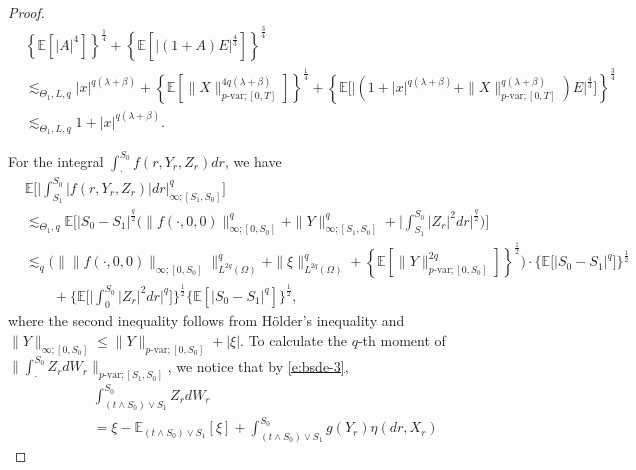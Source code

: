 \documentclass[11pt,reqno]{amsart}
\def\E{\mathbb E}
\numberwithin{equation}{section}
\begin{document}
\begin{proof}
\begin{equation*}
\begin{aligned}
&\left\{\mathbb{E}\left[|A|^{4}\right]\right\}^{\frac{1}{4}} +  \left\{\mathbb{E}\left[\left|\left(1 + A\right)E\right|^{\frac{4}{3}}\right]\right\}^{\frac{3}{4}}\\
&\lesssim_{\Theta_{1},L,q} |x|^{q(\lambda+\beta)} + \left\{\E[\|X\|^{4q(\lambda+\beta)}_{p\text{-var};[0,T]}]\right\}^{\frac{1}{4}} + \left\{\mathbb{E}\Big[\big| (1 + |x|^{q(\lambda+\beta)}  + \|X\|^{q(\lambda+\beta)}_{p\text{-var};[0,T]} )E\big|^{\frac{4}{3}}\Big]\right\}^{\frac{3}{4}}\\
&\lesssim_{\Theta_{1},L,q} 1 + |x|^{q(\lambda+\beta)}.
\end{aligned}
\end{equation*}

For the integral $\int_{\cdot}^{S_{0}}f(r,Y_{r},Z_{r})dr$, we have 
\begin{equation}\label{e:f terms}
\begin{aligned}
&\mathbb{E}\bigg[\Big|\int_{S_1}^{S_{0}}\left|f(r,Y_r,Z_r)\right|dr\Big|^{q}_{\infty;[S_{1},S_{0}]}\bigg]\\
&\lesssim_{\Theta_{1},q} \mathbb{E}\bigg[|S_{0} - S_{1}|^{\frac{q}{2}}\Big(\|f(\cdot,0,0)\|^{q}_{\infty;[0,S_{0}]} + \|Y\|^{q}_{\infty;[S_{1},S_{0}]}  + \Big|\int_{S_{1}}^{S_{0}}|Z_{r}|^{2}dr \Big|^{\frac{q}{2}}\Big)\bigg]\\
&\lesssim_{q} \Big(\big\|\|f(\cdot,0,0)\|_{\infty;[0,S_{0}]}\big\|^{q}_{L^{2q}(\Omega)} + \|\xi\|^{q}_{L^{2q}(\Omega)} + \left\{\mathbb{E}\left[ \|Y\|^{2q}_{p\text{-var};[0,S_{0}]}\right]\right\}^{\frac{1}{2}}\Big)\cdot \Big\{\mathbb{E}\Big[|S_{0} - S_{1}|^{q}\Big]\Big\}^{\frac{1}{2}} \\ 
&\qquad  + \bigg\{\mathbb{E}\bigg[\Big|\int_{0}^{S_{0}}|Z_{r}|^{2}dr\Big|^{q}\bigg]\bigg\}^{\frac{1}{2}} \Big\{\mathbb{E}\left[|S_{0} - S_{1}|^{q}\right]\Big\}^{\frac{1}{2}},
\end{aligned}
\end{equation}
where the second inequality follows from H\"older's inequality and $\|Y\|_{\infty;[0,S_{0}]}\le \|Y\|_{p\text{-var};[0,S_{0}]} + |\xi|$.
To calculate the $q$-th moment of $\|\int_{\cdot}^{S_0}Z_r dW_r\|_{p\text{-var};[S_{1},S_{0}]}$, we notice that  by \eqref{e:bsde-3}, 
\begin{equation}\label{e:SPDE-estimate-Stoping 2}
\begin{aligned}
&\int_{(t\land S_{0})\vee S_{1}}^{S_{0}} Z_{r} dW_{r}\\
&=  \xi - \mathbb{E}_{(t\land S_{0})\vee S_{1}}\left[\xi\right] + \int_{(t\land S_{0})\vee S_{1}}^{S_{0}} g(Y_{r}) \eta(dr,X_{r})

\end{aligned}
\end{equation}
\end{proof}
\end{document}
